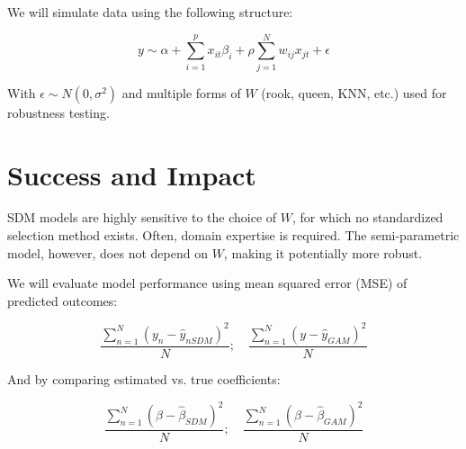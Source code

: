 \documentclass{article}
\begin{document}
We will simulate data using the following structure:

\begin{equation}
	y \sim \alpha + \sum^p_{i=1} x_{it} \beta_i + \rho \sum^N_{j=1} w_{ij} x_{jt} + \epsilon
\end{equation}

With $\epsilon \sim N(0,\sigma^2)$ and multiple forms of $W$ (rook, queen, KNN, etc.) used for robustness testing.

\section{Success and Impact}

SDM models are highly sensitive to the choice of $W$, for which no standardized selection method exists. Often, domain expertise is required. The semi-parametric model, however, does not depend on $W$, making it potentially more robust.

We will evaluate model performance using mean squared error (MSE) of predicted outcomes:

\begin{equation}
	\frac{\sum_{n=1}^N(y_n-\hat{y}_{nSDM})^2}{N}; \quad \frac{\sum_{n=1}^N(y-\hat{y}_{GAM})^2}{N}
	\label{eq:pref}
\end{equation}

And by comparing estimated vs. true coefficients:

\begin{equation}
	\frac{\sum_{n=1}^N(\beta-\hat{\beta}_{SDM})^2}{N}; \quad \frac{\sum_{n=1}^N(\beta-\hat{\beta}_{GAM})^2}{N}
	\label{eq:pref2}
\end{equation}

\newpage



\end{document}
